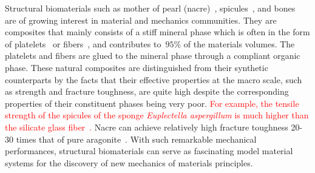\documentclass[preprint,10pt,times]{elsarticle}
\numberwithin{equation}{section}
\renewcommand{\>}{$\Rightarrow$}
\begin{document}
Structural biomaterials such as mother of pearl (nacre)~\cite{jackson1988mechanical}, spicules~\cite{monn2015new}, and bones~\cite{wegst2015bioinspired} are of growing interest in material and mechanics communities.
%
They are composites that mainly consists of a stiff mineral phase which is often in the form of platelets~\cite{currey1977mechanical, meyers2008biological, espinosa2011tablet} or fibers~\cite{Aizenberg2005, zhang2011structure, li2015hierarchical}, and contributes to~$95\%$ of the materials volumes.
%
The platelets and fibers are glued to the mineral phase through a compliant organic phase.
%
These natural composites are distinguished from their synthetic counterparts by the facts that their effective properties at the macro scale, such as strength and fracture toughness, are quite high despite the corresponding properties of their constituent phases being very poor.
%
\textcolor{red}{For example, the tensile strength of the spicules of the sponge \textit{Euplectella aspergillum} is much higher than the silicate glass fiber~\cite{walter2007mechanisms}.}
%
Nacre can achieve relatively high fracture toughness 20-30 times that of pure aragonite~\cite{tang2007elasto, barthelat2007experimental}.
%
With such remarkable mechanical performances, structural biomaterials can serve as fascinating model material systems for the discovery of new mechanics of materials principles.
%
\end{document}
